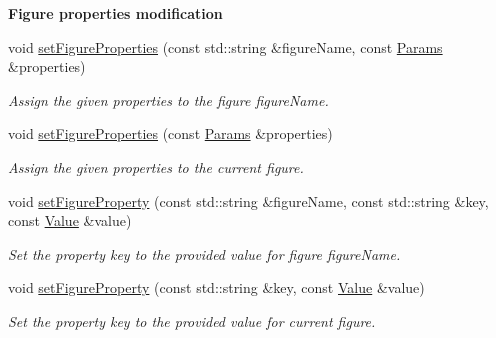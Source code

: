 \begin{Indent}\textbf{ Figure properties modification}\par
\begin{DoxyCompactItemize}
\item 
void \hyperlink{group__figure_gabef77ec6edd8558cfe1b0895ed217e4c}{set\+Figure\+Properties} (const std\+::string \&figure\+Name, const \hyperlink{classvibes_1_1_params}{Params} \&properties)
\begin{DoxyCompactList}\small\item\em Assign the given {\itshape properties} to the figure {\itshape figure\+Name}. \end{DoxyCompactList}\item 
void \hyperlink{group__figure_gaac344cd02f33c886c3da7bae58f1bcb8}{set\+Figure\+Properties} (const \hyperlink{classvibes_1_1_params}{Params} \&properties)
\begin{DoxyCompactList}\small\item\em Assign the given {\itshape properties} to the current figure. \end{DoxyCompactList}\item 
void \hyperlink{group__figure_ga9ca04dbb976e764ef5eb85d33f1dc9cb}{set\+Figure\+Property} (const std\+::string \&figure\+Name, const std\+::string \&key, const \hyperlink{classvibes_1_1_value}{Value} \&value)
\begin{DoxyCompactList}\small\item\em Set the property {\itshape key} to the provided {\itshape value} for figure {\itshape figure\+Name}. \end{DoxyCompactList}\item 
void \hyperlink{group__figure_gac7568a3fa42cfda574b570eed0c7edac}{set\+Figure\+Property} (const std\+::string \&key, const \hyperlink{classvibes_1_1_value}{Value} \&value)
\begin{DoxyCompactList}\small\item\em Set the property {\itshape key} to the provided {\itshape value} for current figure. \end{DoxyCompactList}\end{DoxyCompactItemize}
\end{Indent}
